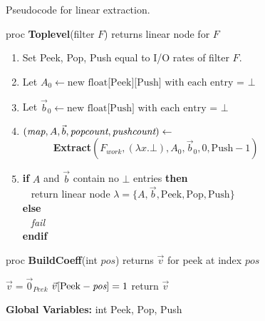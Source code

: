 \begin{algorithm}
\caption{Pseudocode for linear extraction.\protect\label{alg:dataflow}}
proc {\bf Toplevel}(filter $F$) returns linear node for $F$
\begin{enumerate}
\item Set Peek, Pop, Push equal to I/O rates of filter $F$.
\item Let $A_{0} \leftarrow \mbox{new float[Peek][Push] with each entry =~} \bot$
\item Let ${\vec b_{0}} \leftarrow \mbox{new float[Push] with each entry =~} \bot$
\item $(\mbox{\it map}, A, {\vec b}, \mbox{\it popcount}, \mbox{\it pushcount}) \leftarrow$ \\
\verb+      +{\bf Extract}$(F_{work}, (\lambda x . \bot), A_{0}, {\vec b_{0}}, 0, \mbox{Push}-1)$
\item {\bf if} $A$ and ${\vec b}$ contain no $\bot$ entries {\bf then} \\
\verb+ + return linear node $\lambda = \{A, {\vec b}, \mbox{Peek}, \mbox{Pop}, \mbox{Push}\}$ \\
 {\bf else} \\
\verb+ + {\it fail} \\
 {\bf endif}
\end{enumerate}
proc {\bf BuildCoeff}(int $pos$) returns $\vec v$ for peek at index $pos$ \\ \vspace{-12pt}
\begin{algorithmic}
\STATE $\vec v = \vec 0_{Peek}$
\STATE $\vec v[\mbox{Peek}-\mbox{\it pos}] = 1$
\STATE return $\vec v$
\end{algorithmic}
\vspace{6pt}
{\bf Global Variables:} int Peek, Pop, Push
\end{algorithm}

